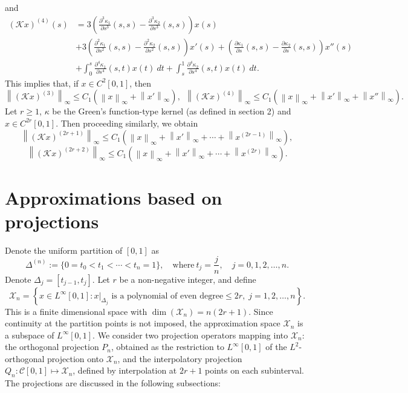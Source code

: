 \documentclass[pdflatex, sn-mathphys-num]{sn-jnl}%
\newcommand{\norm}[1]{\left\lVert #1\right\rVert}
\theoremstyle{thmstyleone}%
\theoremstyle{thmstyletwo}%
\theoremstyle{thmstylethree}%
\begin{document}
and
\begin{align*}
	(\mathcal{K}x)^{(4)}(s) &=  3 \left( \frac{\partial^3 \kappa_1}{\partial s^3}(s, s) - \frac{\partial^3 \kappa_2}{\partial s^3}(s, s) \right) x(s) \\
	&+ 3 \left( \frac{\partial^2 \kappa_1}{\partial s^2}(s, s) - \frac{\partial^2 \kappa_2}{\partial s^2}(s, s) \right) x'(s) + \left( \frac{\partial \kappa_1}{\partial s}(s, s) - \frac{\partial \kappa_2}{\partial s}(s, s) \right) x''(s) \\ 
	&+ \int_{0}^{s} \frac{\partial^4 \kappa_1}{\partial s^4}(s, t) x(t)~dt + \int_{s}^{1} \frac{\partial^4 \kappa_2}{\partial s^4}(s, t) x(t)~dt.
\end{align*}
This implies that, if $x \in C^2[0,1]$, then
\begin{equation*}
	\norm{(\mathcal{K}x)^{(3)}}_\infty \leq C_1 \left( \norm{x}_\infty + \norm{x'}_\infty \right), ~~
	\norm{(\mathcal{K}x)^{(4)}}_\infty \leq C_1 \left( \norm{x}_\infty + \norm{x'}_\infty +  \norm{x''}_\infty \right).
\end{equation*}
Let $r \geq 1$, $\kappa$ be the Green's function-type kernel (as defined in section 2) and $x \in C^{2r}[0,1]$. Then proceeding similarly, we obtain
\begin{equation} \label{Eq: 005}
	\norm{(\mathcal{K}x)^{(2r+1)}}_\infty \leq C_1 \left( \norm{x}_\infty + \norm{x'}_\infty + \cdots + \norm{x^{(2r-1)}}_\infty \right),
\end{equation}
\begin{equation} \label{Eq: 006}
	\norm{(\mathcal{K}x)^{(2r+2)}}_\infty \leq C_1 \left( \norm{x}_\infty + \norm{x'}_\infty + \cdots + \norm{x^{(2r)}}_\infty \right).
\end{equation}



\section{Approximations based on projections}

Denote the uniform partition of $[0,1]$ as
$$
\Delta^{(n)} := \{ 0 =t_0 < t_1 < \cdots <t_n=1\}, \quad \text{where} ~ t_j = \displaystyle{\frac{j}{n}}, \quad j = 0, 1, 2, \ldots, n.
$$ 
Denote $\Delta_{j} = [t_{j-1}, t_j]$. Let $r$ be a non-negative integer, and define
$$
\mathcal{X}_n = \left\{x \in L^\infty[0, 1] : x|_{\Delta_{j}} \text{ is a polynomial of even degree} \leq 2r, \; j=1,2, \ldots, n \right\}. 
$$ 
This is a finite dimensional space with $\dim(\mathcal{X}_n) = n(2r+1)$. Since continuity at the partition points is not imposed, the approximation space $\mathcal{X}_n$ is a subspace of $L^\infty[0,1]$. We consider two projection operators mapping into $\mathcal{X}_n$: the orthogonal projection $P_n$, obtained as the restriction to $L^\infty[0,1]$ of the $L^2$-orthogonal projection onto $\mathcal{X}_n$, and the interpolatory projection $Q_n:\mathcal{C}[0,1]\mapsto\mathcal{X}_n$, defined by interpolation at $2r+1$ points on each subinterval. The projections are discussed in the following subsections:
\end{document}
